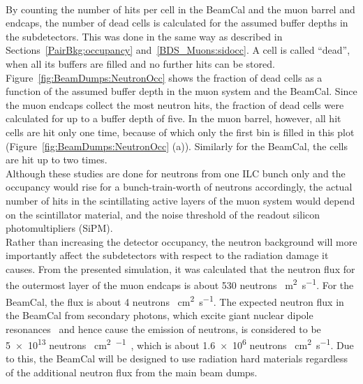 \\By counting the number of hits per cell in the BeamCal and the muon barrel and endcaps, the number of dead cells is calculated for the assumed buffer depths in the subdetectors.
This was done in the same way as described in Sections~\ref{PairBkg:occupancy} and~\ref{BDS_Muons:sidocc}.
A cell is called ``dead'', when all its buffers are filled and no further hits can be stored.
Figure~\ref{fig:BeamDumps:NeutronOcc} shows the fraction of dead cells as a function of the assumed buffer depth in the \sid muon system and the \sid BeamCal.
Since the muon endcaps collect the most neutron hits, the fraction of dead cells were calculated for up to a buffer depth of five.
In the muon barrel, however, all hit cells are hit only one time, because of which only the first bin is filled in this plot (Figure~\ref{fig:BeamDumps:NeutronOcc} (a)).
Similarly for the BeamCal, the cells are hit up to two times.
\\Although these studies are done for neutrons from one ILC bunch only and the occupancy would rise for a bunch-train-worth of neutrons accordingly, the actual number of hits in the scintillating active layers of the muon system would depend on the scintillator material, and the noise threshold of the readout silicon photomultipliers (SiPM).
\\Rather than increasing the detector occupancy, the neutron background will more importantly affect the subdetectors with respect to the radiation damage it causes.
From the presented \geant simulation, it was calculated that the neutron flux for the outermost layer of the muon endcaps is about 530 neutrons \si{\per\meter\squared\per\second}.
For the BeamCal, the flux is about 4 neutrons \si{\per\centi\meter\squared\per\second}.
The expected neutron flux in the BeamCal from secondary photons, which excite giant nuclear dipole resonances~\cite{GDR} and hence cause the emission of neutrons, is considered to be \num{5e13} neutrons \si{\per\centi\meter\squared\per\year}~\cite[p. 134]{TDR4}, which is about \num{1.6e6} neutrons \si{\per\centi\meter\squared\per\second}.
Due to this, the BeamCal will be designed to use radiation hard materials regardless of the additional neutron flux from the main beam dumps.
